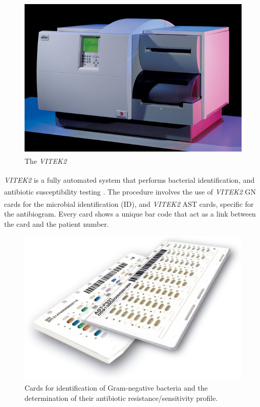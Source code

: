 \documentclass[11pt]{report}
\begin{document}
\begin{figure}[htp]
\centering
\includegraphics[scale=0.500]{img/Vitek_III.jpg}
\caption{The \emph{VITEK}\textsuperscript{\textregistered}\emph{2}}
\label{}
\end{figure}

\emph{VITEK}\textsuperscript{\textregistered}\emph{2} is a fully automated system that performs bacterial identification, and antibiotic susceptibility testing \cite{vitek2}.
The procedure involves the use of \emph{VITEK}\textsuperscript{\textregistered}\emph{2} GN cards for the microbial identification (ID), and \emph{VITEK}\textsuperscript{\textregistered}\emph{2} AST cards, specific for the antibiogram.
Every card shows a unique bar code that act as a link between the card and the patient number.

\begin{figure}[htp]
\centering
\includegraphics[scale=0.20]{img/Vitek_Cards.jpg}
\caption{Cards for identification of Gram-negative bacteria and the determination of their antibiotic resistance/sensitivity profile.}
\label{}
\end{figure}
\end{document}
